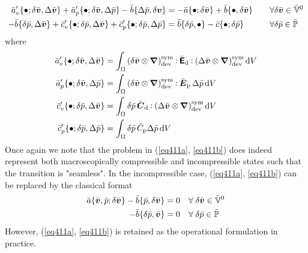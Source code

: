 \documentclass[10pt,a4paper]{article}
\newcommand{\ded}{\mathrm{d}}
\newcommand{\dep}{\mathrm{p}}
\begin{document}
\begin{align}
 \bar{a}'_v\{\bullet; \delta\bar{\boldsymbol{v}},\Delta\bar{\boldsymbol{v}}\} + \bar{a}'_p\{\bullet; \delta\bar{\boldsymbol{v}},\Delta\bar{p}\} - \bar{b}\{\Delta\bar p, \delta{\boldsymbol{v}}\}
	  &= -\bar{a}\{\bullet; \delta\bar{\boldsymbol{v}}\} + \bar{b}\{\bullet, \delta\bar{\boldsymbol{v}}\}
\quad &&\forall \delta\bar{\boldsymbol{v}}\in \bar{\mathbb{V}}^0
 \label{eq414a}\\
- \bar{b}\{\delta\bar p, \Delta\bar{\boldsymbol{v}}\} + \bar{c}'_v\{\bullet; \delta\bar{p}, \Delta\bar{ \boldsymbol{v}}\} + \bar{c}'_p\{\bullet; \delta\bar{p},\Delta\bar{p}\}
	  &= \bar{b}\{\delta\bar{p},\bullet\} - \bar{c}\{\bullet;\delta\bar{p}\}
\quad &&\forall \delta\bar{p} \in \bar{\mathbb{P}}
 \label{eq414b}
\end{align}
where
\begin{align}
 \bar{a}'_v\{\bullet; \delta\bar{\ta v},\Delta\bar{\ta v}\} &= \int_\Omega \left(\delta\bar{\ta v}\outerp\diff\right)^\sym_\dev \dprod \bar{\tf{E}}_\ded \dprod \left(\Delta\bar{\ta v}\outerp\diff\right)^\sym_\dev \dif V
 \label{eq415a}\\
 \bar{a}'_p\{\bullet; \delta\bar{\ta v},\Delta\bar{p}\}     &= \int_\Omega \left(\delta\bar{\ta v}\outerp\diff\right)^\sym_\dev \dprod \bar{\ts E}_\dep \,\Delta\bar{p} \dif V
 \label{eq415b}\\
 \bar{c}'_v\{\bullet; \delta\bar{p}, \Delta\bar{ \ta v}\}   &= \int_\Omega \delta\bar{p} \,\bar{\ts C}_\ded \dprod \left(\Delta\bar{\ta v}\outerp\diff\right)^\sym_\dev \dif V
 \label{eq415c}\\
 \bar{c}'_p\{\bullet; \delta\bar{p},\Delta\bar{p}\}         &= \int_\Omega \delta\bar{p} \,\bar{C}_\dep \Delta\bar p\dif V
 \label{eq415d}
\end{align}
Once again we note that the problem in (\ref{eq411a}, \ref{eq411b}) does indeed represent both macroscopically compressible and incompressible states such that the transition is "seamless".
In the incompressible case, (\ref{eq411a}, \ref{eq411b}) can be replaced by the classical format
\begin{align}
 \bar a\{\bar{\boldsymbol{v}},\bar p; \delta\bar{\boldsymbol{v}}\} - \bar b\{\bar p, \delta\bar{\boldsymbol{v}}\} &= 0   \quad \forall\; \delta\bar{\boldsymbol{v}} \in \bar{\mathbb{V}}^0
 \label{eq420a}\\
 - \bar b\{\delta\bar p, \bar{\boldsymbol{v}}\} &= 0   \quad \forall\; \delta\bar p \in \bar{\mathbb{P}}
 \label{eq420b}
\end{align}
However, (\ref{eq411a}, \ref{eq411b}) is retained as the operational formulation in practice.
\end{document}
